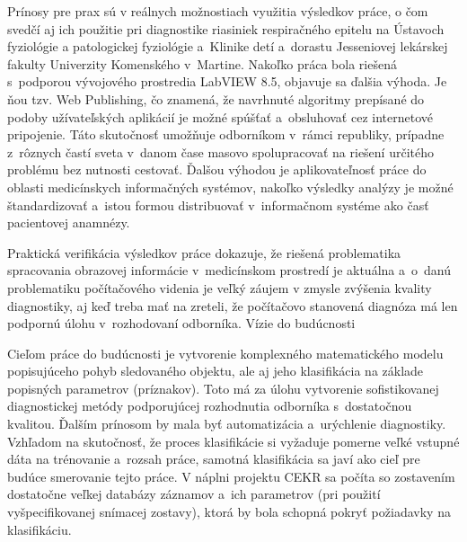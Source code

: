 Prínosy pre prax sú v reálnych možnostiach využitia výsledkov práce, o čom svedčí aj ich použitie pri diagnostike riasiniek respiračného epitelu na Ústavoch fyziológie  a patologickej fyziológie a Klinike detí a dorastu Jesseniovej lekárskej fakulty Univerzity Komenského v Martine. Nakoľko práca bola riešená s podporou vývojového prostredia LabVIEW 8.5, objavuje sa ďalšia výhoda. Je ňou tzv. Web Publishing, čo znamená, že navrhnuté algoritmy prepísané do podoby užívateľských aplikácií je možné spúšťať a obsluhovať cez internetové pripojenie. Táto skutočnosť umožňuje odborníkom v rámci republiky, prípadne z rôznych častí sveta v danom čase masovo spolupracovať na riešení určitého problému bez nutnosti cestovať.
Ďalšou výhodou je aplikovateľnosť práce do oblasti medicínskych informačných systémov, nakoľko výsledky analýzy je možné štandardizovať a istou formou distribuovať v informačnom systéme ako časť pacientovej anamnézy.

Praktická verifikácia výsledkov práce dokazuje, že riešená problematika spracovania obrazovej informácie v medicínskom prostredí je aktuálna a o danú problematiku počítačového videnia je veľký záujem v zmysle zvýšenia kvality diagnostiky, aj keď treba mať na zreteli, že počítačovo stanovená diagnóza má len podpornú úlohu v rozhodovaní odborníka.
Vízie do budúcnosti

Cieľom práce do budúcnosti je vytvorenie komplexného matematického modelu popisujúceho pohyb sledovaného objektu, ale aj jeho klasifikácia na základe popisných parametrov (príznakov). Toto má za úlohu vytvorenie sofistikovanej diagnostickej metódy podporujúcej rozhodnutia odborníka s dostatočnou kvalitou. Ďalším prínosom by mala byť automatizácia a urýchlenie diagnostiky. 
Vzhľadom na skutočnosť, že proces klasifikácie si vyžaduje pomerne veľké vstupné dáta na trénovanie a rozsah práce, samotná klasifikácia sa javí ako cieľ pre budúce smerovanie tejto práce. V náplni projektu CEKR sa počíta so zostavením dostatočne veľkej databázy záznamov a ich parametrov (pri použití vyšpecifikovanej snímacej zostavy), ktorá by bola schopná pokryť požiadavky na klasifikáciu. 


